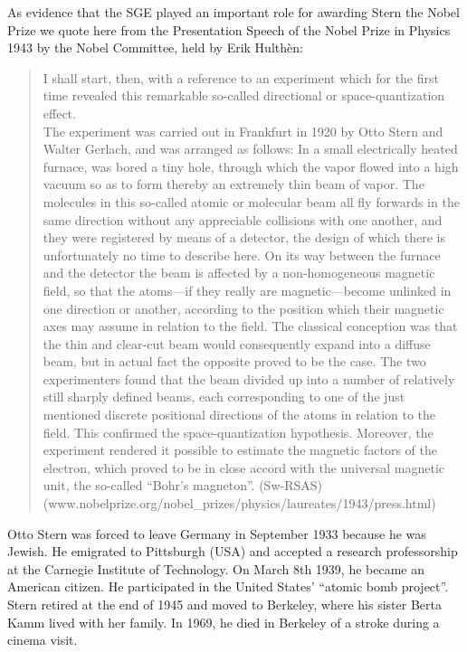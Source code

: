 \documentclass{article}
\begin{document}
As evidence that the SGE played an important role for awarding Stern the Nobel Prize we quote here from the Presentation Speech of the Nobel Prize in Physics 1943 by the Nobel Committee, held by Erik Hulthèn: 
\begin{quote}
I shall start, then, with a reference to an experiment which for the first time revealed this remarkable so-called directional or space-quantization effect.\\
The experiment was carried out in Frankfurt in 1920 by Otto Stern and Walter Gerlach, and was arranged as follows: In a small electrically heated furnace, was bored a tiny hole, through which the vapor flowed into a high vacuum so as to form thereby an extremely thin beam of vapor. The molecules in this so-called atomic or molecular beam all fly forwards in the same direction without any appreciable collisions with one another, and they were registered by means of a detector, the design of which there is unfortunately no time to describe here. On its way between the furnace and the detector the beam is affected by a non-homogeneous magnetic field, so that the atoms---if they really are magnetic---become unlinked in one direction or another, according to the position which their magnetic axes may assume in relation to the field. The classical conception was that the thin and clear-cut beam would consequently expand into a diffuse beam, but in actual fact the opposite proved to be the case. The two experimenters found that the beam divided up into a number of relatively still sharply defined beams, each corresponding to one of the just mentioned discrete positional directions of the atoms in relation to the field. This confirmed the space-quantization hypothesis. Moreover, the experiment rendered it possible to estimate the magnetic factors of the electron, which proved to be in close accord with the universal magnetic unit, the so-called ``Bohr's magneton''. (Sw-RSAS) 
(www.nobelprize.org/nobel\_prizes/physics/laureates/1943/press.html)
\end{quote}

Otto Stern was forced to leave Germany in September 1933 because he was Jewish. He emigrated to Pittsburgh (USA) and accepted a research professorship at the Carnegie Institute of Technology. On March 8th 1939, he became an American citizen.
He participated in the United States' ``atomic bomb project''. Stern retired at the end of 1945 and moved to Berkeley, where his sister Berta Kamm lived with her family. In 1969, he died in Berkeley of a stroke during a cinema visit. 
\end{document}
